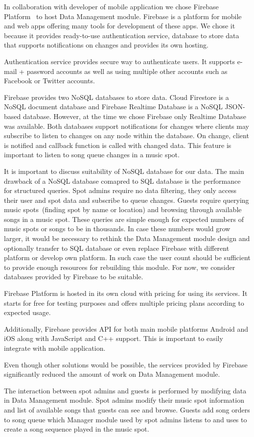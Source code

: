 In collaboration with developer of mobile application we chose Firebase Platform~\citep{firebase} to host Data Management module. Firebase is a platform for mobile and web apps offering many tools for development of these apps. We chose it because it provides ready-to-use authentication service, database to store data that supports notifications on changes and provides its own hosting.
\par
Authentication service provides secure way to authenticate users. It supports e-mail + password accounts as well as using multiple other accounts such as Facebook or Twitter accounts.
\par
Firebase provides two NoSQL databases to store data. Cloud Firestore is a NoSQL document database and Firebase Realtime Database is a NoSQL JSON-based database. However, at the time we chose Firebase only Realtime Database was available. Both databases support notifications for changes where clients may subscribe to listen to changes on any node within the database. On change, client is notified and callback function is called with changed data. This feature is important to listen to song queue changes in a music spot.
\par
It is important to discuss suitability of NoSQL database for our data. The main drawback of a NoSQL database comapred to SQL database is the performance for structured queries. Spot admins require no data filtering, they only access their user and spot data and subscribe to queue changes. Guests require querying music spots~(finding spot by name or location) and browsing through available songs in a music spot. These queries are simple enough for expected numbers of music spots or songs to be in thousands. In case these numbers would grow larger, it would be necessary to rethink the Data Management module design and optionally transfer to SQL database or even replace Firebase with different platform or develop own platform. In such case the user count should be sufficient to provide enough resources for rebuilding this module. For now, we consider databases provided by Firebase to be suitable.
\par
Firebase Platform is hosted in its own cloud with pricing for using its services. It starts for free for testing purposes and offers multiple pricing plans according to expected usage.
\par
Additionally, Firebase provides API for both main mobile platforms Android and iOS along with JavaScript and C++ support. This is important to easily integrate with mobile application.
\par
Even though other solutions would be possible, the services provided by Firebase significantly reduced the amount of work on Data Management module.
\par
The interaction between spot admins and guests is performed by modifying data in Data Management module. Spot admins modify their music spot information and list of available songs that guests can see and browse. Guests add song orders to song queue which Manager module used by spot admins listens to and uses to create a song sequence played in the music spot.

